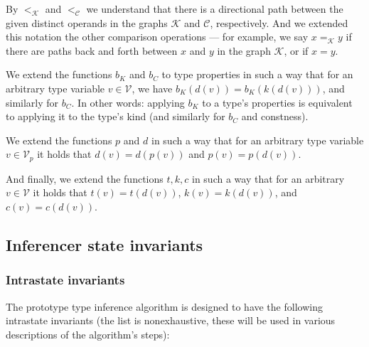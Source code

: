 By $<_{\mathcal{K}}$ and $<_{\mathcal{C}}$ we understand that there is a directional path between the given distinct operands in the graphs $\mathcal{K}$ and $\mathcal{C}$, respectively. And we extended this notation the other comparison operations --- for example, we say $x =_{\mathcal{K}} y$ if there are paths back and forth between $x$ and $y$ in the graph $\mathcal{K}$, or if $x = y$.


\begin{defn}
    We extend the functions $b_K$ and $b_C$ to type properties in such a way that for an arbitrary type variable $v \in \mathcal{V}$, we have $b_K (d (v)) = b_K (k (d (v)))$, and similarly for $b_C$. In other words: applying $b_K$ to a type's properties is equivalent to applying it to the type's kind (and similarly for $b_C$ and constness).

    We extend the functions $p$ and $d$ in such a way that for an arbitrary type variable $v \in \mathcal{V}_p$ it holds that $d(v) = d(p(v))$ and $p(v) = p(d(v))$.

    And finally, we extend the functions $t, k, c$ in such a way that for an arbitrary $v \in \mathcal{V}$ it holds that $t (v) = t (d (v))$, $k (v) = k (d (v))$, and $c (v) = c (d (v))$.
\end{defn}

\subsection{Inferencer state invariants}
\label{sec:invariants}

\subsubsection{Intrastate invariants}

The prototype type inference algorithm is designed to have the following intrastate invariants (the list is nonexhaustive, these will be used in various descriptions of the algorithm's steps):

